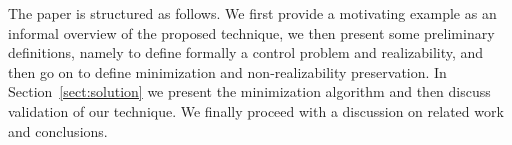 
The paper is structured as follows. We first provide a motivating example as an informal overview of the proposed technique, we then present some preliminary definitions, namely to define formally a control problem and realizability, and then go on to define minimization and non-realizability preservation. In Section~\ref{sect:solution} we present the minimization algorithm and then discuss validation of our technique. We finally proceed with a discussion on related work and conclusions.